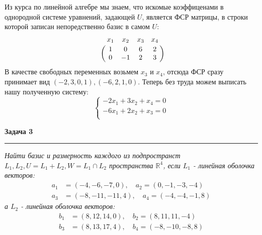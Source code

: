 \documentclass[10pt]{article}
\begin{document}
Из курса по линейной алгебре мы знаем, что искомые коэффиценами в однородной системе уравнений, задающей $U$, является ФСР матрицы, в строки  которой записан непоредственно базис в самом $U$:
\[
\bordermatrix{
	& x_1 & x_2 & x_3 & x_4 \cr 
	& 1 & 0 & 6 & 2 \cr
	& 0 & -1 & 2 & 3 \cr
}
\]
В качестве свободных переменных возьмем $x_3$ и $x_4$, отсюда ФСР сразу принимает  вид $(-2, 3, 0, 1), (-6, 2, 1, 0)$. Теперь без труда можем выписать нашу полученную систему:
\begin{equation*}
\begin{cases}
-2 x_1 + 3x_2 + x_4 = 0 \\
-6 x_1 + 2 x_2 + x_3 = 0 \\
\end{cases}
\end{equation*}
\newpage










\textbf{\Large Задача 3}
\medskip\hrule\medskip 
\textsl{Найти базис и размерность каждого из подпространст $L_1, L_2, U = L_1 + L_2, W = L_1 \cap L_2$ пространства $\mathbb{R}^4$, если $L_1$ - линейная оболочка векторов:}
\begin{align*}
a_1 &= (-4, -6, -7, 0), \quad a_2 = (0, -1, -3, -4) \\
a_3 &= (-8, -11, -11, 4), \quad a_4 = (-4, -4, -1, 8)
\end{align*}
\textsl{а $L_2$ - линейная оболочка векторов:}
\begin{align*}
b_1 &= (8, 12, 14, 0), \quad b_2 = (8, 11, 11, -4) \\
b_3 &= (8, 13, 17, 4), \quad b_4 = (-8, -10, -8, 8)
\end{align*} \\ \\
\end{document}
